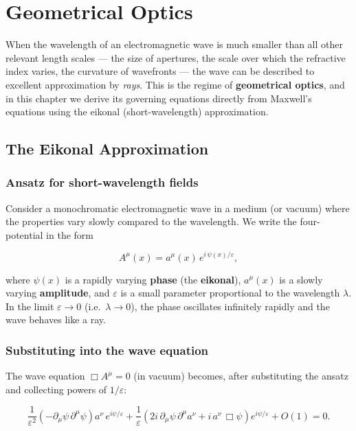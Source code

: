 \chapter{Geometrical Optics}

When the wavelength of an electromagnetic wave is much smaller than all other relevant length scales --- the size of apertures, the scale over which the refractive index varies, the curvature of wavefronts --- the wave can be described to excellent approximation by \emph{rays}. This is the regime of \textbf{geometrical optics}, and in this chapter we derive its governing equations directly from Maxwell's equations using the eikonal (short-wavelength) approximation.

\section{The Eikonal Approximation}

\subsection{Ansatz for short-wavelength fields}

Consider a monochromatic electromagnetic wave in a medium (or vacuum) where the properties vary slowly compared to the wavelength. We write the four-potential in the form

\begin{equation}
A^\mu(x) = a^\mu(x)\,e^{i\,\psi(x)/\varepsilon},
\end{equation}

where $\psi(x)$ is a rapidly varying \textbf{phase} (the \textbf{eikonal}), $a^\mu(x)$ is a slowly varying \textbf{amplitude}, and $\varepsilon$ is a small parameter proportional to the wavelength $\lambda$. In the limit $\varepsilon \to 0$ (i.e.\ $\lambda \to 0$), the phase oscillates infinitely rapidly and the wave behaves like a ray.

\subsection{Substituting into the wave equation}

The wave equation $\Box A^\mu = 0$ (in vacuum) becomes, after substituting the ansatz and collecting powers of $1/\varepsilon$:

\begin{equation}
\frac{1}{\varepsilon^2}\!\left(-\partial_\mu\psi\,\partial^\mu\psi\right)a^\nu\,e^{i\psi/\varepsilon} + \frac{1}{\varepsilon}\!\left(2i\,\partial_\mu\psi\,\partial^\mu a^\nu + i\,a^\nu\,\Box\psi\right)e^{i\psi/\varepsilon} + O(1) = 0.
\end{equation}

